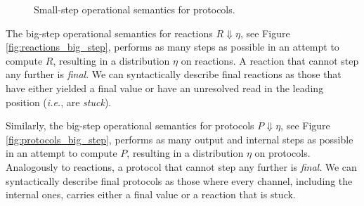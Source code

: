 \begin{figure}
\caption{Small-step operational semantics for \ipdl protocols.}
\label{fig:protocols_semantics}
\end{figure}

The big-step operational semantics for reactions $R \Downarrow \eta$, see Figure \ref{fig:reactions_big_step}, performs as many steps as possible in an attempt to compute $R$, resulting in a distribution $\eta$ on reactions. A reaction that cannot step any further is \emph{final}. We can syntactically describe final reactions as those that have either yielded a final value or have an unresolved read in the leading position (\emph{i.e.}, are \emph{stuck}).

Similarly, the big-step operational semantics for protocols $P \Downarrow \eta$, see Figure \ref{fig:protocols_big_step}, performs as many output and internal steps as possible in an attempt to compute $P$, resulting in a distribution $\eta$ on protocols. Analogously to reactions, a protocol that cannot step any further is \emph{final}. We can syntactically describe final protocols as those where every channel, including the internal ones, carries either a final value or a reaction that is stuck.

